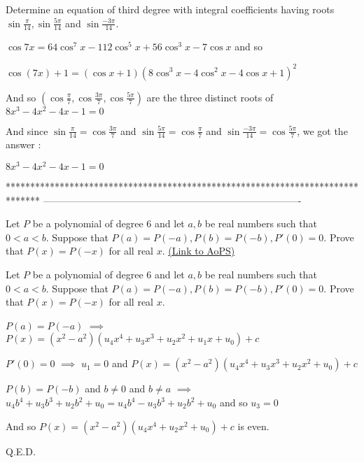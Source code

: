 \begin{solution}
	\begin{tcolorbox}Determine an equation of third degree with integral coefficients having roots $\sin \frac{\pi}{14}, \sin \frac{5 \pi}{14}$ and $\sin \frac{-3 \pi}{14}.$\end{tcolorbox}
$\cos 7x=64\cos^7x-112\cos^5x+56\cos^3x-7\cos x$ and so 

$\cos(7x)+1=(\cos x+1)(8\cos^3x-4\cos^2x-4\cos x+1)^2$

And so $(\cos\frac{\pi}7,\cos\frac{3\pi}7,\cos\frac{5\pi}7)$ are the three distinct roots of $8x^3-4x^2-4x-1=0$

And since $\sin\frac{\pi}{14}=\cos\frac{3\pi}7$ and $\sin\frac{5\pi}{14}=\cos\frac{\pi}7$ and $\sin\frac{-3\pi}{14}=\cos\frac{5\pi}7$, we got the answer :

$\boxed{8x^3-4x^2-4x-1=0}$
\end{solution}
*******************************************************************************
-------------------------------------------------------------------------------

\begin{problem}
	Let $P$ be a polynomial of degree $6$ and let $a,b$ be real numbers such that $0<a<b$. Suppose that $P(a)=P(-a),P(b)=P(-b),P'(0)=0$. Prove that $P(x)=P(-x)$ for all real $x$.
	\flushright \href{https://artofproblemsolving.com/community/c6h385994}{(Link to AoPS)}
\end{problem}



\begin{solution}
	\begin{tcolorbox}Let $P$ be a polynomial of degree $6$ and let $a,b$ be real numbers such that $0<a<b$. Suppose that $P(a)=P(-a),P(b)=P(-b),P'(0)=0$. Prove that $P(x)=P(-x)$ for all real $x$.\end{tcolorbox}
$P(a)=P(-a)$ $\implies$ $P(x)=(x^2-a^2)(u_4x^4+u_3x^3+u_2x^2+u_1x+u_0)+c$

$P'(0)=0$ $\implies$ $u_1=0$ and $P(x)=(x^2-a^2)(u_4x^4+u_3x^3+u_2x^2+u_0)+c$

$P(b)=P(-b)$ and $b\ne 0$ and $b\ne a$ $\implies$ $u_4b^4+u_3b^3+u_2b^2+u_0=u_4b^4-u_3b^3+u_2b^2+u_0$ and so $u_3=0$

And so $P(x)=(x^2-a^2)(u_4x^4+u_2x^2+u_0)+c$ is even.

Q.E.D.
\end{solution}



